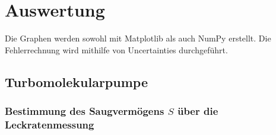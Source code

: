 \section{Auswertung}
\label{sec:Auswertung}

Die Graphen werden sowohl mit Matplotlib \cite{matplotlib} als auch NumPy \cite{numpy} erstellt. Die Fehlerrechnung wird mithilfe von Uncertainties \cite{uncertainties} durchgeführt.

\subsection{Turbomolekularpumpe}

\subsubsection{Bestimmung des Saugvermögens $S$ über die Leckratenmessung}


